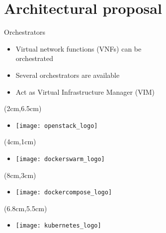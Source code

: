 \section{Architectural proposal}
\begin{frame}{Orchestrators}
  \begin{itemize}
  \item<1-> Virtual network functions (VNFs) can be\\ orchestrated
  \item<2-> Several orchestrators are available
  \item<7-> Act as Virtual Infrastructure Manager (VIM)
  \end{itemize}

  \begin{textblock*}{5cm}(2cm,6.5cm)
    \begin{itemize}
    \item[]<3-> \texttt{[image: openstack\_logo]}
    \end{itemize}
  \end{textblock*}

  \begin{textblock*}{5cm}(4cm,1cm)
    \begin{itemize}
    \item[]<4-> \texttt{[image: dockerswarm\_logo]}
    \end{itemize}
  \end{textblock*}

  \begin{textblock*}{5cm}(8cm,3cm)
    \begin{itemize}
    \item[]<5-> \texttt{[image: dockercompose\_logo]}
    \end{itemize}
  \end{textblock*}

  \begin{textblock*}{5cm}(6.8cm,5.5cm)
    \begin{itemize}
    \item[]<6-> \texttt{[image: kubernetes\_logo]}
    \end{itemize}
  \end{textblock*}
\end{frame}

